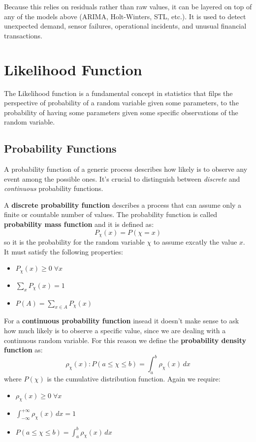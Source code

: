 \documentclass[12pt,a4paper]{article}
\begin{document}
Because this relies on residuals rather than raw values, it can be layered on top of any of the models above (ARIMA, Holt-Winters, STL, etc.). It is used to detect unexpected demand, sensor failures, operational incidents, and unusual financial transactions.

\section{Likelihood Function}
The Likelihood function is a fundamental concept in statistics that filps the perspective
of probability of a random variable given some parameters, to the probability of having
some parameters given some specific observations of the random variable.
\subsection{Probability Functions}
A probability function of a generic process describes how likely is to observe any event among
the possible ones.
It's crucial to distinguish between \textit{discrete} and \textit{continuous} probability functions.

A \textbf{discrete probability function} describes a process that can assume only
a finite or countable number of values. The probability function is called \textbf{probability mass function}
and it is defined as:
\begin{equation}
	P_\chi(x) = P(\chi=x)
\end{equation}
so it is the probability for the random variable $\chi$ to assume excatly the
value $x$. It must satisfy the following properties:
\begin{itemize}
	\item $P_\chi(x) \geq 0 \; \forall x$
	\item $\sum_{x} P_\chi(x) = 1$
	\item $P(A) = \sum_{x\in A} P_\chi(x)$
\end{itemize}

For a \textbf{continuous probability function} insead it doesn't make sense to ask how much
likely is to observe a specific value, since we are dealing with a continuous random variable.
For this reason we define the \textbf{probability density function} as:
\begin{equation}
	\rho_\chi(x) : P(a \leq \chi \leq b) = \int_{a}^{b} \rho_\chi(x) \, dx
\end{equation}
where $P(\chi)$ is the cumulative distribution function. Again we require:
\begin{itemize}
	\item $\rho_\chi(x) \geq 0 \; \forall x$
	\item $\int_{-\infty}^{+\infty} \rho_\chi(x) \, dx = 1$
	\item $P(a \leq \chi \leq b) = \int_{a}^{b} \rho_\chi(x) \, dx$
\end{itemize}
\end{document}

